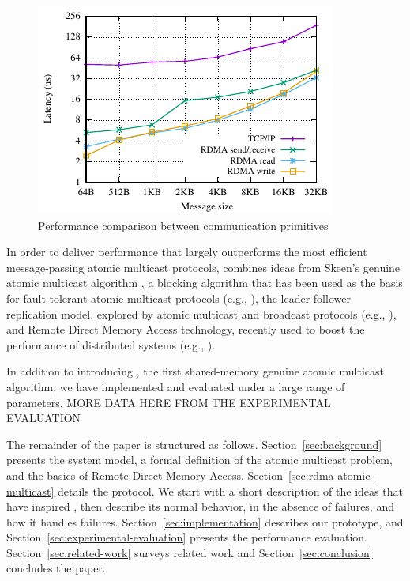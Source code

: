 \begin{figure}[htp!]
    \centering
    \includegraphics[width=0.99\columnwidth]{figures/benchmark/graphs/figure-protocol-bench.pdf}
  \caption{Performance comparison between communication primitives}
  \label{fig:perfcomp}
\end{figure}

In order to deliver performance that largely outperforms the most efficient message-passing atomic multicast protocols, \libname combines ideas from Skeen's genuine atomic multicast algorithm \cite{BJ87b}, a blocking algorithm that has been used as the basis for fault-tolerant atomic multicast protocols (e.g., \cite{Coelho2017,gotsman2019white}), the leader-follower replication model, explored by atomic multicast and broadcast protocols (e.g., \cite{gotsman2019white,Junqueira2011,Mu}), and Remote Direct Memory Access technology, recently used to boost the performance of distributed systems (e.g., \cite{Aguilera2019,kalia2014using, kalia2016design, mitchell2013using}).

In addition to introducing \libname, the first shared-memory genuine atomic multicast algorithm, we have implemented and evaluated \libname under a large range of parameters. 
MORE DATA HERE FROM THE EXPERIMENTAL EVALUATION

The remainder of the paper is structured as follows.
Section~\ref{sec:background} presents the system model, a formal definition of the atomic multicast problem, and the basics of Remote Direct Memory Access.
Section~\ref{sec:rdma-atomic-multicast} details the \libname protocol.
We start with a short description of the ideas that have inspired \libname, then describe its normal behavior, in the absence of failures, and how it handles failures.
Section~\ref{sec:implementation} describes our prototype, and Section~\ref{sec:experimental-evaluation} presents the performance evaluation.
Section~\ref{sec:related-work} surveys related work and Section~\ref{sec:conclusion} concludes the paper.

